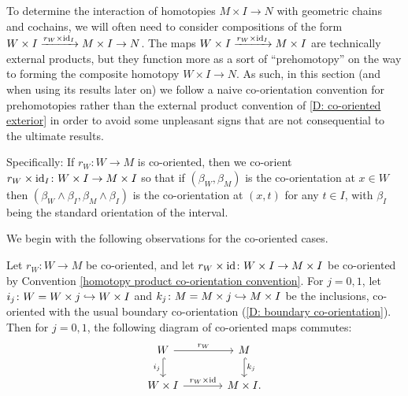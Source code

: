 \begin{convention}\label{homotopy product co-orientation convention}
	To determine the interaction of homotopies $M \times I \to N$ with geometric chains and cochains, we will often need to consider compositions of the form $W \times I \xrightarrow{r_W \times \mathrm{id}_I} M \times I \to N$.
	The maps $W \times I \xrightarrow{r_W \times \mathrm{id}_I} M \times I$ are technically external products, but they function more as a sort of ``prehomotopy'' on the way to forming the composite homotopy $W \times I \to N$.
	As such, in this section (and when using its results later on) we follow a naive co-orientation convention for prehomotopies rather than the external product convention of \cref{D: co-oriented exterior} in order to avoid some unpleasant signs that are not consequential to the ultimate results.

	Specifically: If $r_W \colon W \to M$ is co-oriented, then we co-orient $r_W \times \mathrm{id}_I \colon W \times I \to M \times I$ so that if $(\beta_W,\beta_M)$ is the co-orientation at $x \in W$ then $(\beta_W \wedge \beta_I,\beta_M \wedge \beta_I)$ is the co-orientation at $(x,t)$ for any $t \in I$, with $\beta_I$ being the standard orientation of the interval.
\end{convention}

We begin with the following observations for the co-oriented cases.

\begin{lemma}
	Let $r_W \colon W \to M$ be co-oriented, and let $r_W \times \mathrm{id} \colon W \times I \to M \times I$ be co-oriented by Convention \ref{homotopy product co-orientation convention}.
	For $j = 0,1$, let $i_j \colon W = W \times j \hookrightarrow W \times I$ and $k_j \colon M = M \times j \hookrightarrow M \times I$ be the inclusions, co-oriented with the usual boundary co-orientation (\cref{D: boundary co-orientation}).
	Then for $j = 0,1$, the following diagram of co-oriented maps commutes:
	\[
	\begin{tikzcd}[column sep=large]
		W \arrow[r, "r_W"] \arrow[hookrightarrow,d, "i_j"'] & M \arrow[hookrightarrow,d, "k_j"] \\
		W \times I \arrow[r, "r_W \times \id"] & M \times I.
	\end{tikzcd}
	\]
\end{lemma}


